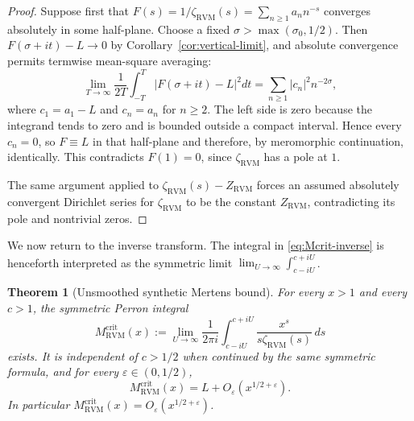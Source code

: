 \documentclass[11pt,reqno]{amsart}
\newtheorem{theorem}{Theorem}[section]
\theoremstyle{definition}
\theoremstyle{remark}
\newcommand{\RVM}{\mathrm{RVM}}
\newcommand{\crit}{\mathrm{crit}}
\begin{document}
\begin{proof}
Suppose first that $F(s)=1/\zeta_{\RVM}(s)=\sum_{n\ge1}a_n n^{-s}$ converges absolutely in some half-plane.  Choose a fixed
$\sigma>\max(\sigma_0,1/2)$.  Then
$F(\sigma+it)-L\to0$ by Corollary~\ref{cor:vertical-limit}, and absolute convergence permits termwise mean-square averaging:
\[
 \lim_{T\to\infty}\frac1{2T}\int_{-T}^T|F(\sigma+it)-L|^2dt
 =\sum_{n\ge1}|c_n|^2n^{-2\sigma},
\]
where $c_1=a_1-L$ and $c_n=a_n$ for $n\ge2$.  The left side is zero because the integrand tends to zero and is bounded outside a compact interval.  Hence every $c_n=0$, so $F\equiv L$ in that half-plane and therefore, by meromorphic continuation, identically.  This contradicts $F(1)=0$, since $\zeta_{\RVM}$ has a pole at $1$.

The same argument applied to $\zeta_{\RVM}(s)-Z_{\RVM}$ forces an assumed absolutely convergent Dirichlet series for $\zeta_{\RVM}$ to be the constant $Z_{\RVM}$, contradicting its pole and nontrivial zeros.
\end{proof}

We now return to the inverse transform.  The integral in \eqref{eq:Mcrit-inverse} is henceforth interpreted as the symmetric limit
$\lim_{U\to\infty}\int_{c-iU}^{c+iU}$.

\begin{theorem}[Unsmoothed synthetic Mertens bound]\label{thm:unsmoothed-RVM}
For every $x>1$ and every $c>1$, the symmetric Perron integral
\begin{equation}\label{eq:Mcrit-symmetric}
 M_{\RVM}^{\crit}(x)
 :=\lim_{U\to\infty}\frac1{2\pi i}
 \int_{c-iU}^{c+iU}\frac{x^s}{s\zeta_{\RVM}(s)}\,ds
\end{equation}
exists.  It is independent of $c>1/2$ when continued by the same symmetric formula, and for every $\varepsilon\in(0,1/2)$,
\begin{equation}\label{eq:Mcrit-unsmoothed-bound}
 \boxed{M_{\RVM}^{\crit}(x)=L+O_\varepsilon(x^{1/2+\varepsilon}).}
\end{equation}
In particular $M_{\RVM}^{\crit}(x)=O_\varepsilon(x^{1/2+\varepsilon})$.
\end{theorem}
\end{document}

